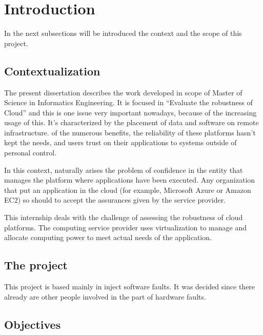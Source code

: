 \newpage
\section{Introduction}

In the next subsections will be introduced the context and the scope of this project.

\subsection{Contextualization}
The present dissertation describes the work developed in scope of Master of Science in Informatics Engineering. It is focused in ``Evaluate the robustness of Cloud'' and this is one issue very important nowadays, because of the increasing usage of this.
It's characterized by the placement of data and software on remote infrastructure.  of the numerous benefits, the reliability of these platforms hasn't kept the needs, and users trust on their applications to systems outside of personal control.

In this context, naturally arises the problem of confidence in the entity that manages the platform where applications have been executed. Any organization that put an application in the cloud (for example, Microsoft Azure or Amazon EC2) so should to accept the assurances given by the service provider.

This internship deals with the challenge of assessing the robustness of cloud platforms. The computing service provider uses virtualization to manage and allocate computing power to meet actual needs of the application.



\subsection{The project}

This project is based mainly in inject software faults. It was decided since there already are other people involved in the part of hardware faults.

\subsection{Objectives}

